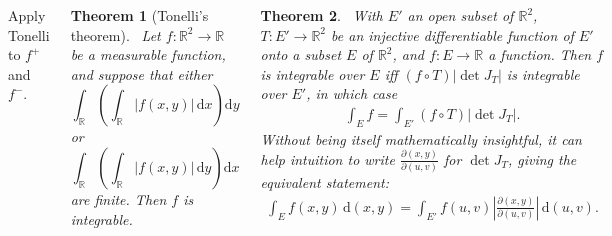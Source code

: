 \documentclass{tikzposter} %
\newtheorem{theorem}{Theorem}
\begin{document}
\begin{columns}
{        Apply Tonelli to $f^{+}$ and $f^{-}$. \\

        \begin{theorem}[Tonelli's theorem]
        \ Let $f : \mathbb{R}^{2} \to \mathbb{R}$ be a measurable function, and suppose that either
        \[
          \int_{\mathbb{R}}\left(\int_{\mathbb{R}} |f(x,y)| \,\mathrm{d}x\right)\mathrm{d}y
        \]
        or
        \[
          \int_{\mathbb{R}}\left(\int_{\mathbb{R}} |f(x,y)| \,\mathrm{d}y\right)\mathrm{d}x
        \]
        are finite. Then $f$ is integrable.
        \end{theorem}
        \hphantom{}

        \begin{theorem}
          \ With $E'$ an open subset of $\mathbb{R}^{2}$, $T : E' \to \mathbb{R}^{2}$ be an injective differentiable function of $E'$ onto a subset $E$ of $\mathbb{R}^{2}$, and $f : E \to \mathbb{R}$ a function. Then $f$ is integrable over $E$ iff $(f \circ T)|\det J_{T} |$ is integrable over $E'$, in which case
          \begin{align*}
            \int_{E} f = \int_{E'} (f \circ T) |\det J_{T}|.
          \end{align*}
          Without being itself mathematically insightful, it can help intuition to write $\displaystyle \frac{\partial (x, y)}{\partial (u, v)}$ for $\det J_{T}$, giving the equivalent statement:
          \begin{align*}
            \int_{E} f(x,y) \, \mathrm{d}(x,y) = \int_{E'} f(u,v) \left|\frac{\partial (x,y)}{\partial (u,v)}\right| \, \mathrm{d}(u,v).
          \end{align*}
        \end{theorem}
      }

\end{columns}
\end{document}
